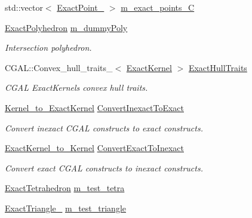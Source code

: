 \begin{DoxyCompactItemize}
\item 
std\+::vector$<$ \hyperlink{_c_g_a_l__typedefs_8h_a162dbf669b38ca5632e00c9c02e000a5}{Exact\+Point\+\_} $>$ \hyperlink{classcarl_1_1_intersection___tools_a473d6a254b10623659a1d8f81bbe695f}{m\+\_\+exact\+\_\+points\+\_\+\+C}
\item 
\hyperlink{_c_g_a_l__typedefs_8h_aedf4279eda927d338212e13db24116eb}{Exact\+Polyhedron} \hyperlink{classcarl_1_1_intersection___tools_a1bc3cab10caf53e5de762c4dea2ef1ba}{m\+\_\+dummy\+Poly}
\begin{DoxyCompactList}\small\item\em Intersection polyhedron. \end{DoxyCompactList}\item 
C\+G\+A\+L\+::\+Convex\+\_\+hull\+\_\+traits\+\_$<$ \hyperlink{_c_g_a_l__typedefs_8h_ab014831fee2bac62051dfa390ec66d6f}{Exact\+Kernel} $>$ \hyperlink{classcarl_1_1_intersection___tools_a0a3b4e978977cd29ebac810dc0a2baf6}{Exact\+Hull\+Traits}
\begin{DoxyCompactList}\small\item\em C\+G\+A\+L Exact\+Kernel\textquotesingle{}s convex hull traits. \end{DoxyCompactList}\item 
\hyperlink{_c_g_a_l__typedefs_8h_a7fee49db11d7ad002fa79aedabf4d2cc}{Kernel\+\_\+to\+\_\+\+Exact\+Kernel} \hyperlink{classcarl_1_1_intersection___tools_a89118c79160362561c0cf7f1743568a6}{Convert\+Inexact\+To\+Exact}
\begin{DoxyCompactList}\small\item\em Convert inexact C\+G\+A\+L constructs to exact constructs. \end{DoxyCompactList}\item 
\hyperlink{_c_g_a_l__typedefs_8h_aa71268402de3c241e32cd09e20cbe44c}{Exact\+Kernel\+\_\+to\+\_\+\+Kernel} \hyperlink{classcarl_1_1_intersection___tools_a8cd632ee9314f5981c620af325245413}{Convert\+Exact\+To\+Inexact}
\begin{DoxyCompactList}\small\item\em Convert exact C\+G\+A\+L constructs to inexact constructs. \end{DoxyCompactList}\item 
\hyperlink{_c_g_a_l__typedefs_8h_a02a72c8dcf4a17c7460e7e71301d2d3f}{Exact\+Tetrahedron} \hyperlink{classcarl_1_1_intersection___tools_a69657597ebb9655f8797b289939835a3}{m\+\_\+test\+\_\+tetra}
\item 
\hyperlink{_c_g_a_l__typedefs_8h_acb9586e4ea704b6a4c4502ad0cb03c62}{Exact\+Triangle\+\_} \hyperlink{classcarl_1_1_intersection___tools_a4331121a50baaa93e499f6cfb446c1b0}{m\+\_\+test\+\_\+triangle}

\end{DoxyCompactItemize}
